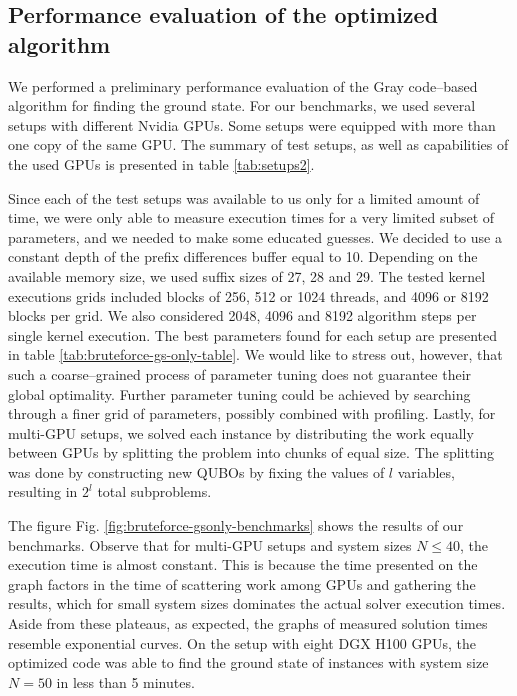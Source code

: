 \subsection{Performance evaluation of the optimized algorithm}

We performed a preliminary performance evaluation of the Gray code--based algorithm for finding the ground state. For our benchmarks, we used several setups with different Nvidia GPUs. Some setups were equipped with more than one copy of the same GPU. The summary of test setups, as well as capabilities of the used GPUs is presented in table \ref{tab:setups2}.

Since each of the test setups was available to us only for a limited amount of time, we were only able to measure
execution times for a very limited subset of parameters, and we needed to make some educated guesses. We decided to
use a constant depth of the prefix differences buffer equal to 10. Depending on the available memory size, we used suffix sizes of 27, 28 and 29. The tested kernel executions grids included blocks of 256, 512 or 1024 threads, and 4096 or 8192 blocks per grid. We also considered 2048, 4096 and 8192 algorithm steps per single kernel execution. The best parameters found for each setup are presented in table \ref{tab:bruteforce-gs-only-table}. We would like to stress out,  however, that such a coarse--grained process of parameter tuning does not guarantee their global optimality. Further
parameter tuning could be achieved by searching through a finer grid of parameters, possibly combined with profiling.
Lastly, for multi-GPU setups, we solved each instance by distributing the work equally between GPUs by splitting the problem into chunks of equal size. The splitting was done by constructing new QUBOs by fixing the values of $l$ variables, resulting in $2^{l}$ total subproblems.

The figure Fig. \ref{fig:bruteforce-gsonly-benchmarks} shows the results of our benchmarks. Observe that for multi-GPU setups and system sizes $N \le 40$, the execution time is almost constant. This is because the time presented on the graph factors in the time of scattering work among GPUs and gathering the results, which for small system sizes dominates the actual solver execution times. Aside from these plateaus, as expected, the graphs of measured solution times
resemble exponential curves. On the setup with eight DGX H100 GPUs, the optimized code was able to find the ground state of instances with system size $N=50$ in less than 5 minutes.

